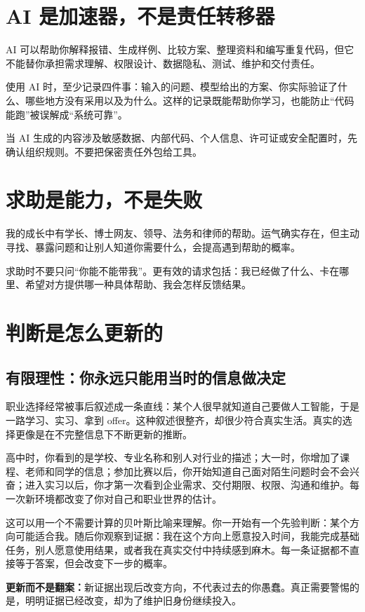 \documentclass[UTF8,zihao=5,openany]{ctexbook}
\begin{document}
\section{AI 是加速器，不是责任转移器}
AI 可以帮助你解释报错、生成样例、比较方案、整理资料和编写重复代码，但它不能替你承担需求理解、权限设计、数据隐私、测试、维护和交付责任。

使用 AI 时，至少记录四件事：输入的问题、模型给出的方案、你实际验证了什么、哪些地方没有采用以及为什么。这样的记录既能帮助你学习，也能防止“代码能跑”被误解成“系统可靠”。

\begin{warningbox}
当 AI 生成的内容涉及敏感数据、内部代码、个人信息、许可证或安全配置时，先确认组织规则。不要把保密责任外包给工具。
\end{warningbox}

\section{求助是能力，不是失败}
我的成长中有学长、博士网友、领导、法务和律师的帮助。运气确实存在，但主动寻找、暴露问题和让别人知道你需要什么，会提高遇到帮助的概率。

求助时不要只问“你能不能带我”。更有效的请求包括：我已经做了什么、卡在哪里、希望对方提供哪一种具体帮助、我会怎样反馈结果。

\section{判断是怎么更新的}
\subsection{有限理性：你永远只能用当时的信息做决定}
职业选择经常被事后叙述成一条直线：某个人很早就知道自己要做人工智能，于是一路学习、实习、拿到 offer。这种叙述很整齐，却很少符合真实生活。真实的选择更像是在不完整信息下不断更新的推断。

高中时，你看到的是学校、专业名称和别人对行业的描述；大一时，你增加了课程、老师和同学的信息；参加比赛以后，你开始知道自己面对陌生问题时会不会兴奋；进入实习以后，你才第一次看到企业需求、交付期限、权限、沟通和维护。每一次新环境都改变了你对自己和职业世界的估计。

这可以用一个不需要计算的贝叶斯比喻来理解。你一开始有一个先验判断：某个方向可能适合我。随后你观察到证据：我在这个方向上愿意投入时间，我能完成基础任务，别人愿意使用结果，或者我在真实交付中持续感到麻木。每一条证据都不直接等于答案，但会改变下一步的概率。

\begin{keybox}
\textbf{更新而不是翻案：}新证据出现后改变方向，不代表过去的你愚蠢。真正需要警惕的是，明明证据已经改变，却为了维护旧身份继续投入。
\end{keybox}
\end{document}
